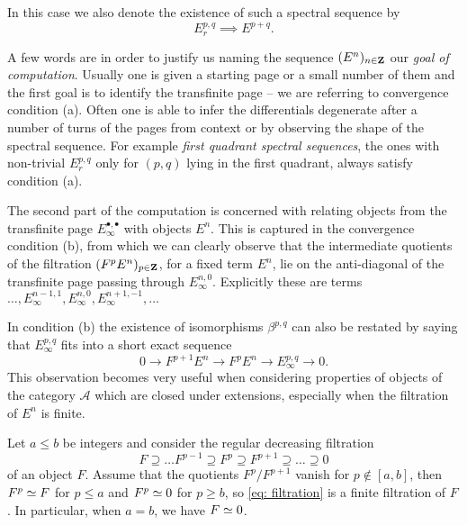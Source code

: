 \begin{definition}
In this case we also denote the existence of such a spectral sequence by 
\[
    E^{p,q}_r \implies E^{p+q}.
\]
\end{definition}

\begin{remark}
    A few words are in order to justify us naming the sequence $(E^n)_{n \in \mathbf Z}$ our \emph{goal of computation}. Usually one is given a starting page or a small number of them and the first goal is to identify the transfinite page -- we are referring to convergence condition (a). Often one is able to infer the differentials degenerate after a number of turns of the pages from context or by observing the shape of the spectral sequence. For example \emph{first quadrant spectral sequences}, \ie the ones with non-trivial $E^{p,q}_r$ only for $(p,q)$ lying in the first quadrant, always satisfy condition (a).

    The second part of the computation is concerned with relating objects from the transfinite page $E^{\bullet, \bullet}_\infty$ with objects $E^n$. This is captured in the convergence condition (b), from which we can clearly observe that the intermediate quotients of the filtration $(F^p E^n)_{p \in \mathbf Z}$, for a fixed term $E^n$, lie on the anti-diagonal
    of the transfinite page passing through \eg $E^{n, 0}_\infty$. Explicitly these are terms $\dots, E^{n-1,1}_\infty, E^{n,0}_\infty, E^{n+1,-1}_\infty, \dots$
    
    In condition (b) the existence of isomorphisms $\beta^{p,q}$ can also be restated by saying that $E^{p,q}_\infty$ fits into a short exact sequence
    \begin{equation}
        \label{eq: SES of filtration}
        0 \to F^{p + 1} E^n \to F^p E^n \to E^{p,q}_\infty \to 0.
    \end{equation}
    This observation becomes very useful when considering properties of objects of the category $\mathcal A$ which are closed under extensions, especially when the filtration of $E^n$ is finite.

 \end{remark}

\begin{lemma}
    \label{finite filtration}
    Let $a \leq b$ be integers and consider the regular decreasing filtration
    \begin{equation}
        \label{eq: filtration}
        F \supseteq \dots F^{p-1} \supseteq F^p \supseteq F^{p + 1} \supseteq \dots \supseteq 0
    \end{equation}
    of an object $F$. Assume that the quotients $F^p/F^{p+1}$ vanish for $p \notin [a,b]$, then $F^{p} \simeq F$ for $p \leq a$ and $F^{p} \simeq 0$ for $p \geq b$, so \eqref{eq: filtration} is a finite filtration of $F$. In particular, when $a = b$, we have $F \simeq 0$.
\end{lemma}

